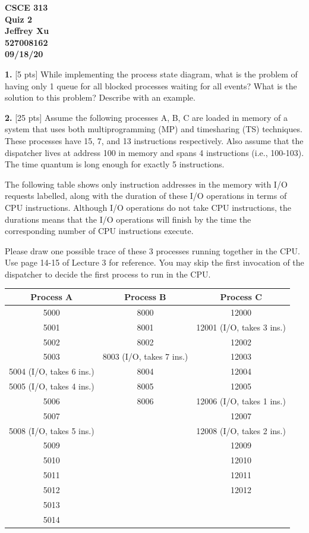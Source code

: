 \documentclass[12pt]{article}
\begin{document}
\begin{center}

{\bf
CSCE 313\\
Quiz 2\\
Jeffrey Xu\\
527008162\\
09/18/20\\
}

\end{center}

{\bf 1.} [5 pts] While implementing the process state diagram, what is the problem of having only 1 queue for all blocked processes waiting for all events? What is the solution to this problem? Describe with an example.

{\bf 2.} [25 pts] Assume the following processes A, B, C are loaded in memory of a system that uses both multiprogramming (MP) and timesharing (TS) techniques. These processes have 15, 7, and 13 instructions respectively. Also assume that the dispatcher lives at address 100 in memory and spans 4 instructions (i.e., 100-103). The time quantum is long enough for exactly 5 instructions.

The following table shows only instruction addresses in the memory with I/O requests labelled, along with the duration of these I/O operations in terms of CPU instructions. Although I/O operations do not take CPU instructions, the durations means that the I/O operations will finish by the time the corresponding number of CPU instructions execute.

Please draw one possible trace of these 3 processes running together in the CPU. Use page 14-15 of Lecture 3 for reference. You may skip the first invocation of the dispatcher to decide the first process to run in the CPU. 

\begin{center}
\begin{tabular}{| c | c | c |}
\hline
{\bf Process A} & {\bf Process B} & {\bf Process C}\\
\hline\hline
5000 & 8000 & 12000\\
\hline
5001 & 8001 & 12001 (I/O, takes 3 ins.)\\
\hline
5002 & 8002 & 12002\\
\hline
5003 & 8003 (I/O, takes 7 ins.) & 12003\\
\hline
5004 (I/O, takes 6 ins.) & 8004 & 12004\\
\hline
5005 (I/O, takes 4 ins.) & 8005 & 12005\\
\hline
5006 & 8006 & 12006 (I/O, takes 1 ins.)\\
\hline
5007 & & 12007\\
\hline
5008 (I/O, takes 5 ins.) & & 12008 (I/O, takes 2 ins.)\\
\hline
5009 & & 12009\\
\hline
5010 & & 12010\\
\hline
5011 & & 12011\\
\hline
5012 & & 12012\\
\hline
5013 & & \\
\hline
5014 & & \\
\hline
\end{tabular}
\end{center}
\end{document}
